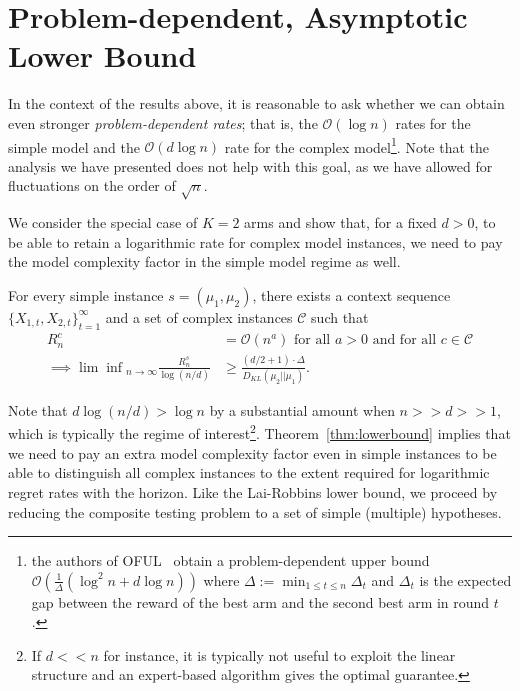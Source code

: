 \section{Problem-dependent, Asymptotic Lower Bound}

In the context of the results above, it is reasonable to ask whether we can obtain even stronger \textit{problem-dependent rates}; that is, the $\mathcal{O}(\log n)$ rates for the simple model and the $\mathcal{O}(d \log n)$ rate for the complex model\footnote{the authors of OFUL~\cite{abbasi2011improved} obtain a problem-dependent upper bound $\mathcal{O}\left( \frac{1}{\Delta} \left( \log^2 n + d \log n \right) \right)$ where $\Delta := \min_{1 \leq t \leq n} \Delta_t$ and $\Delta_t$ is the expected gap between the reward of the best arm and the second best arm in round $t$.}.
Note that the analysis we have presented does not help with this goal, as we have allowed for fluctuations on the order of $\sqrt{n}$.

We consider the special case of $K = 2$ arms and show that, for a fixed $d > 0$, to be able to retain a logarithmic rate for complex model instances, we need to pay the model complexity factor in the simple model regime as well.

\begin{theorem}\label{thm:lowerbound}
For every simple instance $s = (\mu_1, \mu_2)$, there exists a context sequence $\{X_{1,t}, X_{2,t}\}_{t=1}^{\infty}$ and a set of complex instances $\mathcal{C}$ such that
\begin{align*}
    R_n^c &= \mathcal{O}(n^a) \text{ for all $a > 0$ and for all $c \in \mathcal{C}$} \\
    \implies {\lim \inf}_{n \to \infty} \frac{R_n^s}{\log \left(n/d\right)} &\geq \frac{(d/2 + 1) \cdot \Delta}{D_{KL}(\mu_2 || \mu_1)} .
\end{align*}

\end{theorem}

Note that $d \log \left(n/d\right) > \log n$ by a substantial amount when $n >> d >> 1$, which is typically the regime of interest\footnote{If $d << n$ for instance, it is typically not useful to exploit the linear structure and an expert-based algorithm gives the optimal guarantee.}.
Theorem~\ref{thm:lowerbound} implies that we need to pay an extra model complexity factor even in simple instances to be able to distinguish all complex instances to the extent required for logarithmic regret rates with the horizon.
Like the Lai-Robbins lower bound, we proceed by reducing the composite testing problem to a set of simple (multiple) hypotheses.

